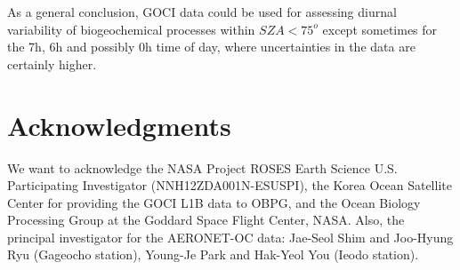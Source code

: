 \documentclass[onecolumn,3p,letterpaper,11pt]{elsarticle}
\begin{document}
As a general conclusion, GOCI data could be used for assessing diurnal variability of biogeochemical processes within $SZA < 75^o$ except sometimes for the 7h, 6h and possibly 0h time of day, where uncertainties in the data are certainly higher. 


\section*{Acknowledgments}
\vspace{-.2cm}
We want to acknowledge the NASA Project ROSES Earth Science U.S. Participating Investigator (NNH12ZDA001N-ESUSPI), the Korea Ocean Satellite Center for providing the GOCI L1B data to OBPG, and the Ocean Biology Processing Group at the Goddard Space Flight Center, NASA. Also, the principal investigator for the AERONET-OC data: Jae-Seol Shim and Joo-Hyung Ryu (Gageocho station), Young-Je Park and Hak-Yeol You (Ieodo station).


\end{document}

